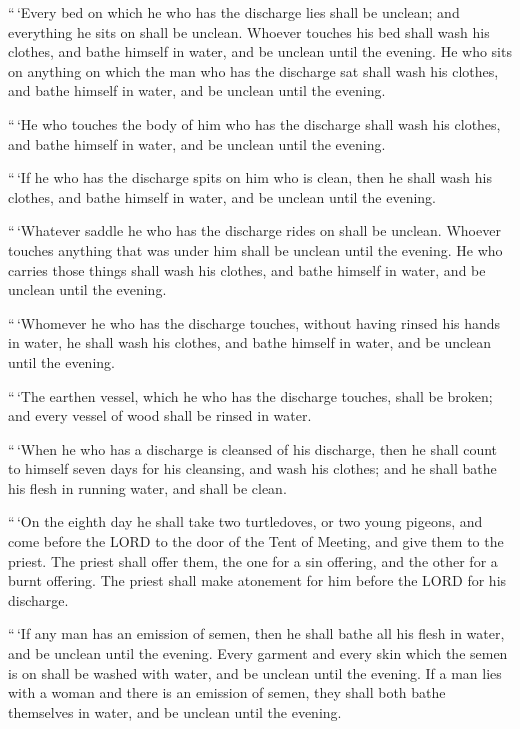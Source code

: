  ``\,`Every bed on which he who has the discharge lies shall
be unclean; and everything he sits on shall be unclean. 
Whoever touches his bed shall wash his clothes, and bathe himself in
water, and be unclean until the evening.  He who sits on
anything on which the man who has the discharge sat shall wash his
clothes, and bathe himself in water, and be unclean until the evening.

 ``\,`He who touches the body of him who has the discharge
shall wash his clothes, and bathe himself in water, and be unclean until
the evening.

 ``\,`If he who has the discharge spits on him who is clean,
then he shall wash his clothes, and bathe himself in water, and be
unclean until the evening.

 ``\,`Whatever saddle he who has the discharge rides on
shall be unclean.  Whoever touches anything that was under
him shall be unclean until the evening. He who carries those things
shall wash his clothes, and bathe himself in water, and be unclean until
the evening.

 ``\,`Whomever he who has the discharge touches, without
having rinsed his hands in water, he shall wash his clothes, and bathe
himself in water, and be unclean until the evening.

 ``\,`The earthen vessel, which he who has the discharge
touches, shall be broken; and every vessel of wood shall be rinsed in
water.

 ``\,`When he who has a discharge is cleansed of his
discharge, then he shall count to himself seven days for his cleansing,
and wash his clothes; and he shall bathe his flesh in running water, and
shall be clean.

 ``\,`On the eighth day he shall take two turtledoves, or
two young pigeons, and come before the LORD to the door of the Tent of
Meeting, and give them to the priest.  The priest shall
offer them, the one for a sin offering, and the other for a burnt
offering. The priest shall make atonement for him before the LORD for
his discharge.

 ``\,`If any man has an emission of semen, then he shall
bathe all his flesh in water, and be unclean until the evening.
 Every garment and every skin which the semen is on shall
be washed with water, and be unclean until the evening.  If
a man lies with a woman and there is an emission of semen, they shall
both bathe themselves in water, and be unclean until the evening.

